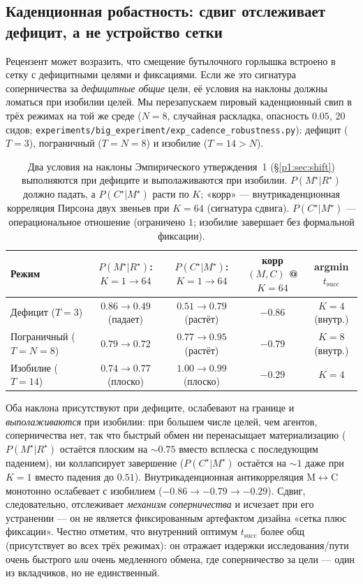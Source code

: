 \documentclass{article}
\newcommand{\method}[1]{\texttt{#1}}
\begin{document}
\subsection{Каденционная робастность: сдвиг отслеживает дефицит, а не устройство сетки}
\label{p1:app:cadence-robustness}

Рецензент может возразить, что смещение бутылочного горлышка встроено в сетку с дефицитными
целями и фиксациями. Если же это сигнатура соперничества за \emph{дефицитные
общие} цели, её условия на наклоны должны ломаться при изобилии целей. Мы
перезапускаем пировый каденционный свип в трёх режимах на той же среде ($N{=}8$, случайная
раскладка, опасность $0.05$, $20$ сидов; \method{experiments/big\_experiment/exp\_cadence\_robustness.py}):
дефицит ($T{=}3$), пограничный ($T{=}N{=}8$) и изобилие ($T{=}14{>}N$).

\begin{table}[h]
\caption{Два условия на наклоны Эмпирического утверждения~1 (\S\ref{p1:sec:shift}) выполняются при дефиците и выполаживаются при изобилии. $P(M^\star|R^\star)$ должно падать, а $P(C^\star|M^\star)$ расти по $K$; «корр» --- внутрикаденционная корреляция Пирсона двух звеньев при $K{=}64$ (сигнатура сдвига). $P(C^\star|M^\star)$ --- операциональное отношение (ограничено $1$; изобилие завершает без формальной фиксации).}
\label{p1:tab:cadence-robustness}
\centering
\small
\begin{tabular}{l c c c c}
\toprule
Режим & $P(M^\star|R^\star)$: $K{=}1\!\to\!64$ & $P(C^\star|M^\star)$: $K{=}1\!\to\!64$ & корр$(M,C)$ @ $K{=}64$ & argmin $t_{\mathrm{succ}}$ \\
\midrule
Дефицит ($T{=}3$)      & $0.86 \to 0.49$ (падает) & $0.51 \to 0.79$ (растёт) & $-0.86$ & $K{=}4$ (внутр.) \\
Пограничный ($T{=}N{=}8$) & $0.79 \to 0.72$        & $0.77 \to 0.95$ (растёт) & $-0.79$ & $K{=}8$ (внутр.) \\
Изобилие ($T{=}14$)    & $0.74 \to 0.77$ (плоско)  & $1.00 \to 0.99$ (плоско)  & $-0.29$ & $K{=}4$ \\
\bottomrule
\end{tabular}
\end{table}

Оба наклона присутствуют при дефиците, ослабевают на границе и \emph{выполаживаются}
при изобилии: при большем числе целей, чем агентов, соперничества нет, так что быстрый
обмен ни перенасыщает материализацию ($P(M^\star|R^\star)$ остаётся плоским
на $\sim0.75$ вместо всплеска с последующим падением), ни коллапсирует завершение
($P(C^\star|M^\star)$ остаётся на $\sim1$ даже при $K{=}1$ вместо падения до
$0.51$). Внутрикаденционная антикорреляция M$\leftrightarrow$C монотонно
ослабевает с изобилием ($-0.86\to-0.79\to-0.29$). Сдвиг, следовательно,
отслеживает \emph{механизм соперничества} и исчезает при его устранении --- он
не является фиксированным артефактом дизайна «сетка плюс фиксации». Честно отметим, что
внутренний оптимум $t_{\mathrm{succ}}$ более общ (присутствует во всех трёх
режимах): он отражает издержки исследования/пути очень быстрого \emph{или} очень
медленного обмена, где соперничество за цели --- один из вкладчиков, но не единственный.
\end{document}

